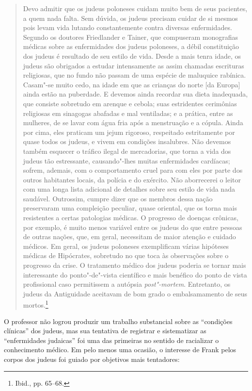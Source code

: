 \begin{quote}
Devo admitir que os judeus poloneses cuidam muito bem de seus pacientes,
a quem nada falta. Sem dúvida, os judeus precisam cuidar de si mesmos
pois levam vida lutando constantemente contra diversas enfermidades.
Segundo os doutores Friedlander e Tainer, que compuseram monografias
médicas sobre as enfermidades dos judeus poloneses, a débil constituição
dos judeus é resultado de seu estilo de vida. Desde a mais tenra idade,
os judeus são obrigados a estudar intensamente as assim chamadas
escrituras religiosas, que no fundo não passam de uma espécie de
maluquice rabínica. Casam"-se muito cedo, na idade em que as crianças do
norte {[}da Europa{]} ainda estão na puberdade. E devemos ainda recordar
sua dieta inadequada, que consiste sobretudo em arenque e cebola; suas
estridentes cerimônias religiosas em sinagogas abafadas e mal
ventiladas; e a prática, entre as mulheres, de se lavar com água fria
após a menstruação e a cópula. Ainda por cima, eles praticam um jejum
rigoroso, respeitado estritamente por quase todos os judeus, e vivem em
condições insalubres. Não devemos também esquecer o tráfico ilegal de
mercadorias, que torna a vida dos judeus tão estressante, causando"-lhes
muitas enfermidades cardíacas; sofrem, ademais, com o comportamento
cruel para com eles por parte dos outros habitantes locais, da polícia e
do exército. Não aborrecerei o leitor com uma longa lista adicional de
detalhes sobre seu estilo de vida nada saudável. Outrossim, cumpre dizer
que os membros dessa nação preservaram uma compleição peculiar, quase
oriental, que os torna mais resistentes a certas patologias médicas. O
progresso de doenças crônicas, por exemplo, é muito menos variável entre
os judeus do que entre pessoas de outras nações, que, em geral,
necessitam de maior atenção e cuidado médicos. Em geral, os judeus
poloneses exemplificam várias hipóteses médicas de Hipócrates, sobretudo
no que toca às observações sobre o progresso da crise. O tratamento
médico dos judeus poderia se tornar mais interessante do ponto"-de"-vista
científico e mais benéfico do ponto de vista profissional caso
permitissem a autópsia \textit{post"-mortem}. Entretanto, os judeus da
Antiguidade aceitavam de bom grado o embalsamamento de seus
mortos.\footnote{Ibid., pp. 65--68.}
\end{quote}

O professor não logrou produzir um trabalho substancial sobre as
``condições clínicas'' dos judeus, mas sua tentativa de registrar e
sistematizar as ``enfermidades judaicas'' foi uma das primeiras no
sentido de racializar o conhecimento médico. Em pelo menos uma ocasião,
o interesse de Frank pelos corpos dos judeus foi guiado por objetivos
mais tentadores:

